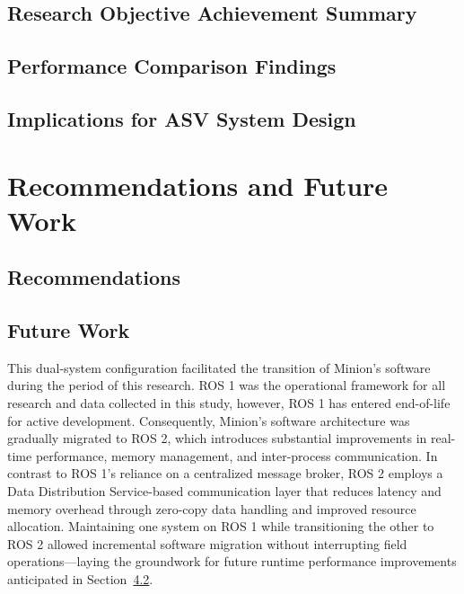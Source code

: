 \documentclass{erauthesis}
\begin{document}
\section{Research Objective Achievement Summary}

\section{Performance Comparison Findings}

\section{Implications for ASV System Design}


\chapter{Recommendations and Future Work} \label{chap:recommendations}


\section{Recommendations} \label{sec:recommendations}

\section{Future Work} \label{futurework}

This dual-system configuration facilitated the transition of Minion's software during the period of this research.
\ac{ROS} 1 was the operational framework for all research and data collected in this study, however, \ac{ROS} 1 has entered end-of-life for active development.
Consequently, Minion’s software architecture was gradually migrated to \ac{ROS} 2, which introduces substantial improvements in real-time performance, memory management, and inter-process communication.
In contrast to ROS 1’s reliance on a centralized message broker, ROS 2 employs a Data Distribution Service-based communication layer that reduces latency and memory overhead through zero-copy data handling and improved resource allocation.
Maintaining one system on ROS 1 while transitioning the other to ROS 2 allowed incremental software migration without interrupting field operations—laying the groundwork for future runtime performance improvements anticipated in Section~\ref{futurework}.
\end{document}
